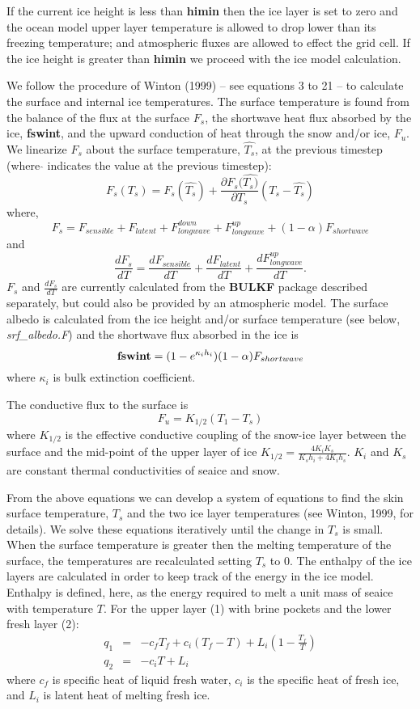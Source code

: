 If the current ice height is less than {\bf himin} then
the ice layer is set to zero and the ocean model upper layer temperature
is allowed to drop lower than its freezing temperature; and atmospheric
fluxes are allowed to effect the grid cell.
If the ice height is greater than  {\bf himin} we proceed with
the ice model calculation.

We follow the procedure
of Winton (1999) -- see equations 3 to 21 -- to calculate
the surface and internal ice temperatures. 
The surface temperature is found from the balance of the
flux at the surface $F_s$, the shortwave heat flux absorbed by the ice, 
{\bf fswint}, and
the upward conduction of heat through the snow and/or ice, $F_u$.
We linearize $F_s$ about the surface temperature, $\hat{T_s}$, 
at the previous timestep (where \mbox{}$\hat{ }$ indicates the value at
the  previous timestep):
\[
F_s (T_s) = F_s(\hat{T_s}) + \frac{\partial F_s(\hat{T_s)}}{\partial T_s}
(T_s-\hat{T_s})
\]
where, 
\[
F_s  =  F_{sensible}+F_{latent}+F_{longwave}^{down}+F_{longwave}^{up}+ (1-
\alpha) F_{shortwave}
\]
and
\[
 \frac{d F_s}{dT} = \frac{d F_{sensible}}{dT} + \frac{d F_{latent}}{dT}
+\frac{d F_{longwave}^{up}}{dT}.
\]
$F_s$ and $\frac{d F_s}{dT}$ are currently calculated from the {\bf BULKF} 
package described separately, but could also be provided by an atmospheric
model. The surface albedo is calculated from the ice height and/or 
surface temperature (see below, {\it srf\_albedo.F}) and the 
shortwave flux absorbed in the ice is
\[
{\bf fswint} = (1-e^{\kappa_i h_i})(1-\alpha) F_{shortwave}
\]
where $\kappa_i$ is bulk extinction coefficient.

The conductive flux to the surface is
\[
F_u=K_{1/2}(T_1-T_s)
\]
where $K_{1/2}$ is the effective conductive coupling of the snow-ice
layer between the surface and the mid-point of the upper layer of ice
$
K_{1/2}=\frac{4 K_i K_s}{K_s h_i + 4 K_i h_s}
$.
$K_i$ and $K_s$ are constant thermal conductivities of seaice and snow.

From the above equations we can develop a system of equations to
find the skin surface temperature, $T_s$ and the two ice layer
temperatures (see Winton, 1999, for details). We solve these
equations iteratively until the change in $T_s$ is small.
When the surface temperature is greater then
the melting temperature of the surface, the temperatures are
recalculated setting $T_s$ to 0.  The enthalpy
of the ice layers are calculated in order to keep track of the energy in the
ice model. Enthalpy is defined, here, as the energy required to melt a
unit mass of seaice with temperature $T$.
For the upper layer (1) with brine pockets  and
the lower fresh layer (2):
\begin{eqnarray}
q_1 & = & - c_f T_f + c_i (T_f-T)+ L_{i}(1-\frac{T_f}{T})
\nonumber \\
q_2 & = & -c_i T+L_i \nonumber
\end{eqnarray}
where $c_f$ is specific heat of liquid fresh water, $c_i$ is the
specific heat of fresh ice, and $L_i$ is latent heat of melting fresh ice.



